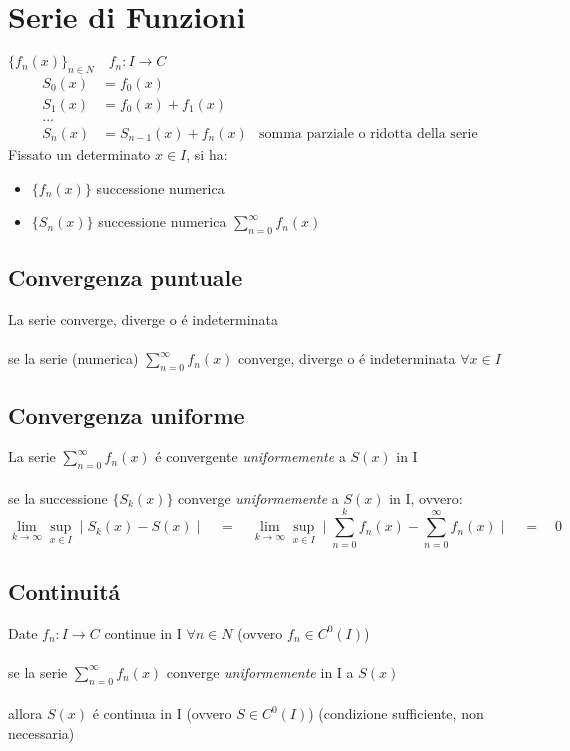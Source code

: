 \documentclass[a4paper,10pt,italian]{article}
\begin{document}
\newpage

\section{Serie di Funzioni}
$\{ f_n(x) \}_{n\in N} \quad f_n:I\rightarrow C$ 
\begin{align*}
S_0(x) &= f_0(x) \\
S_1(x) &= f_0(x) + f_1(x) \\
... \\
S_n(x) &= S_{n-1}(x) + f_n(x) &\mbox{somma parziale o ridotta della serie}
\end{align*}
Fissato un determinato $x \in I$, si ha:
\begin{itemize}
\item $\{f_n(x)\}$ successione numerica
\item $\{S_n(x)\}$ successione numerica $\sum_{n=0}^{\infty}f_n(x)$
\end{itemize}

\subsection{Convergenza puntuale}
La serie converge, diverge o \'e indeterminata \\ \\
se la serie (numerica) $\sum_{n=0}^{\infty}f_n(x)$ converge, diverge o \'e indeterminata $\forall x \in I$

\subsection{Convergenza uniforme}
La serie $\sum_{n=0}^{\infty}f_n(x)$ \'e convergente \emph{uniformemente} a $S(x)$ in I \\ \\
se la successione $\{ S_k(x) \}$ converge \emph{uniformemente} a $S(x)$ in I, ovvero:
$$ \lim_{k\rightarrow\infty} \sup_{x\in I} \mid S_k(x) - S(x) \mid 
\quad = \quad \lim_{k\rightarrow\infty} \sup_{x\in I} \mid \sum_{n=0}^{k}f_n(x) - \sum_{n=0}^{\infty} f_n(x) \mid 
\quad = \quad 0$$

\subsection{Continuit\'a}
Date $f_n:I\rightarrow C$ continue in I $\forall n \in N$ (ovvero $f_n \in C^0(I)$)\\ \\
se la serie $\sum_{n=0}^{\infty} f_n(x)$ converge \emph{uniformemente} in I a $S(x)$ \\ \\
allora $S(x)$ \'e continua in I (ovvero $S\in C^0(I)$) (condizione sufficiente, non necessaria)
\end{document}
